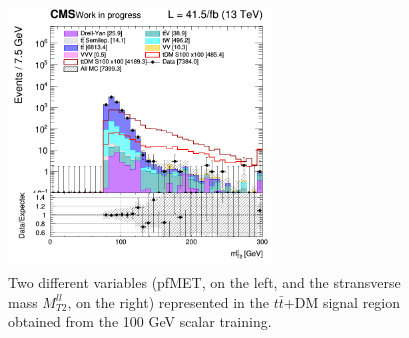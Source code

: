 \documentclass[a4paper, 10pt, openright]{report}
\begin{document}
\begin{figure}[htbp]
{\begin{minipage}[b]{.48\textwidth}
\end{minipage}\hfill
\begin{minipage}[b]{.48\textwidth}
\includegraphics[width=7cm, height=7cm]{figs/2017/SmearSR-ttDM-scalar100/log_cratio_TTbar_topCR_ll_BDT_ttDM100_mt2ll.png}
\end{minipage} \hfill
}
\caption{Two different variables (pf\ac{MET}, on the left, and the stransverse mass $M_{T2}^{ll}$, on the right) represented in the $t \bar t$+DM signal region obtained from the 100 GeV scalar training.}
\label{fig:SR2}
\end{figure}
\end{document}
